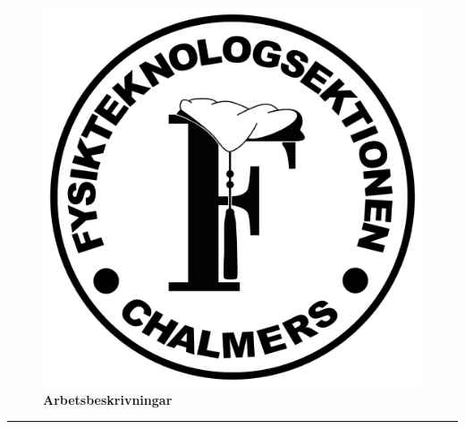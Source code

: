 \documentclass[a4paper]{article}
\begin{document}
\standalonefalse %


\thispagestyle{first} %

\begin{figure}
    \centering \includegraphics[width=.45\textwidth]{sektionslogoring.png} \\ %
    \Huge \bfseries Arbetsbeskrivningar
\end{figure}

\tolkning{}

\vfill \hrule \vspace{.5em} %
\begin{multicols}{2} %
  \tableofcontents
\end{multicols}

\newpage


















\end{document}
